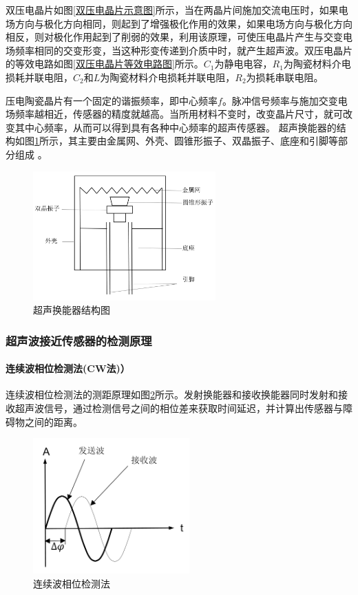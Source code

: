     双压电晶片如图\ref{双压电晶片示意图}所示，当在两晶片间施加交流电压时，如果电场方向与极化方向相同，则起到了增强极化作用的效果，如果电场方向与极化方向相反，则对极化作用起到了削弱的效果，利用该原理，可使压电晶片产生与交变电场频率相同的交变形变，当这种形变传递到介质中时，就产生超声波。双压电晶片的等效电路如图\ref{双压电晶片等效电路图}所示。$C_1$为静电电容，$R_1$为陶瓷材料介电损耗并联电阻，$C_2$和$L$为陶瓷材料介电损耗并联电阻，$R_2$为损耗串联电阻。\par

    压电陶瓷晶片有一个固定的谐振频率，即中心频率$f$。脉冲信号频率与施加交变电场频率越相近，传感器的精度就越高。当所用材料不变时，改变晶片尺寸，就可改变其中心频率，从而可以得到具有各种中心频率的超声传感器。
    超声换能器的结构如图\ref{超声换能器结构图}所示，其主要由金属网、外壳、圆锥形振子、双晶振子、底座和引脚等部分组成 。
    \begin{figure}[!h]
    	\centering
    	\includegraphics[width=7cm]{figure/超声换能器结构图.png}
    	\caption{超声换能器结构图}
    	\label{超声换能器结构图}
    \end{figure}
\newpage
    \subsubsection{超声波接近传感器的检测原理}
    \paragraph{连续波相位检测法(CW法)）}
    连续波相位检测法的测距原理如图\ref{连续波相位检测法}所示。发射换能器和接收换能器同时发射和接收超声波信号，通过检测信号之间的相位差来获取时间延迟，并计算出传感器与障碍物之间的距离。\par
    \begin{figure}[!h]
    	\centering
    	\includegraphics[width=6cm]{figure/连续波相位检测法.png}
    	\caption{连续波相位检测法}
    	\label{连续波相位检测法}
    \end{figure}\par


